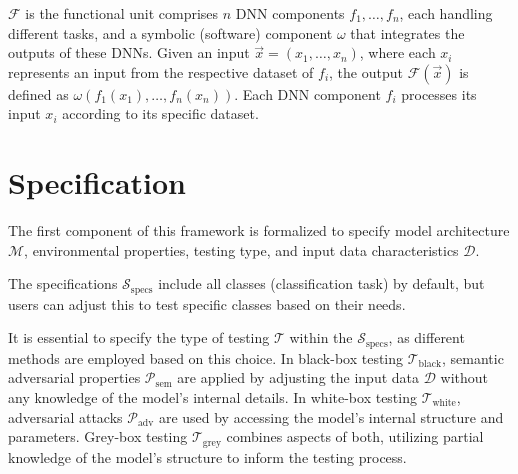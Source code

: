 $\mathcal{F}$ is the functional unit comprises $n$ DNN components $ f_1, \dots, f_n $, each handling different tasks, and a symbolic (software) component $ \omega $ that integrates the outputs of these DNNs. Given an input $\vec{x} = (x_1, \dots, x_n)$, where each $x_i$ represents an input from the respective dataset of $f_i$, the output $\mathcal{F}(\vec{x})$ is defined as $\omega(f_1(x_1), \dots, f_n(x_n))$. Each DNN component $f_i$ processes its input $x_i$ according to its specific dataset.


\section{Specification}
The first component of this framework is formalized to specify model architecture $\mathcal{M}$, environmental properties, testing type, and input data characteristics $\mathcal{D}$. 

The specifications $\mathcal{S}_{\text{specs}}$ include all classes (classification task) by default, but users can adjust this to test specific classes based on their needs.

It is essential to specify the type of testing $\mathcal{T}$ within the $\mathcal{S}_{\text{specs}}$, as different methods are employed based on this choice. In black-box testing $\mathcal{T}_{\text{black}}$, semantic adversarial properties $\mathcal{P}_{\text{sem}}$ are applied by adjusting the input data $\mathcal{D}$ without any knowledge of the model's internal details. In white-box testing $\mathcal{T}_{\text{white}}$, adversarial attacks $\mathcal{P}_{\text{adv}}$ are used by accessing the model's internal structure and parameters. Grey-box testing $\mathcal{T}_{\text{grey}}$ combines aspects of both, utilizing partial knowledge of the model’s structure to inform the testing process. 



